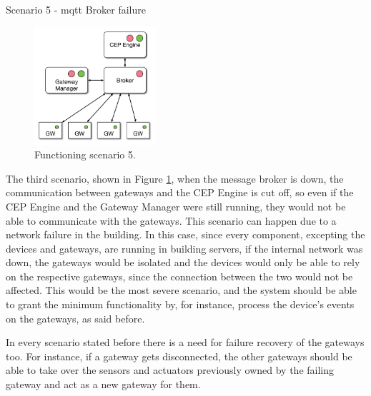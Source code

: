 \begin{Paragraph}{Scenario 5 - \ac{mqtt} Broker failure}
	
	\begin{figure}[H]
		\centering
		\includegraphics[width=0.4\textwidth]{figures/fs3.png}
		\caption{Functioning scenario 5.}
		\label{fig:sc5}
	\end{figure}
	
	The third scenario, shown in Figure \ref{fig:sc5}, when the message broker is down, the communication between gateways and the CEP Engine is cut off, so even if the CEP Engine and the Gateway Manager were still running, they would not be able to communicate with the gateways. This scenario can happen due to a network failure in the building. In this case, since every component, excepting the devices and gateways, are running in building servers, if the internal network was down, the gateways would be isolated and the devices would only be able to rely on the respective gateways, since the connection between the two would not be affected. This would be the most severe scenario, and the system should be able to grant the  minimum functionality by, for instance, process the device's events on the gateways, as said before.
	
\end{Paragraph}


In every scenario stated before there is a need for failure recovery of the gateways too. For instance, if a gateway gets disconnected, the other gateways should be able to take over the sensors and actuators previously owned by the failing gateway and act as a new gateway for them.







